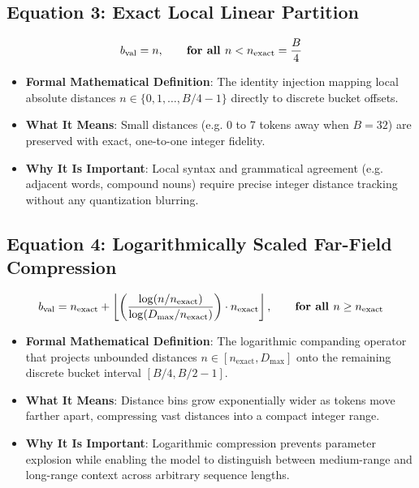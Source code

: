 \documentclass[11pt,a4paper]{article}
\theoremstyle{definition}
\begin{document}
\subsection{\textbf{Equation 3: Exact Local Linear Partition}}
{\boldmath
\begin{equation}
b_{\text{val}} = n, \qquad \text{\textbf{for all }} n < n_{\text{exact}} = \frac{B}{4}
\end{equation}
}
\begin{itemize}
    \item \textbf{Formal Mathematical Definition}:
    The identity injection mapping local absolute distances $n \in \{0, 1, \dots, B/4 - 1\}$ directly to discrete bucket offsets.
    \item \textbf{What It Means}:
    Small distances (e.g. 0 to 7 tokens away when $B=32$) are preserved with exact, one-to-one integer fidelity.
    \item \textbf{Why It Is Important}:
    Local syntax and grammatical agreement (e.g. adjacent words, compound nouns) require precise integer distance tracking without any quantization blurring.
\end{itemize}

\subsection{\textbf{Equation 4: Logarithmically Scaled Far-Field Compression}}
{\boldmath
\begin{equation}
b_{\text{val}} = n_{\text{exact}} + \left\lfloor \left( \frac{\log(n / n_{\text{exact}})}{\log(D_{\text{max}} / n_{\text{exact}})} \right) \cdot n_{\text{exact}} \right\rfloor, \qquad \text{\textbf{for all }} n \ge n_{\text{exact}}
\end{equation}
}
\begin{itemize}
    \item \textbf{Formal Mathematical Definition}:
    The logarithmic companding operator that projects unbounded distances $n \in [n_{\text{exact}}, D_{\text{max}}]$ onto the remaining discrete bucket interval $[B/4, B/2 - 1]$.
    \item \textbf{What It Means}:
    Distance bins grow exponentially wider as tokens move farther apart, compressing vast distances into a compact integer range.
    \item \textbf{Why It Is Important}:
    Logarithmic compression prevents parameter explosion while enabling the model to distinguish between medium-range and long-range context across arbitrary sequence lengths.
\end{itemize}
\end{document}

